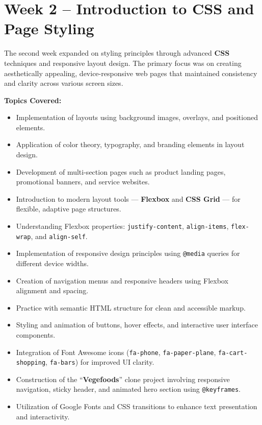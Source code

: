 \documentclass[a4paper,12pt,oneside]{report}
\numberwithin{equation}{chapter}
\numberwithin{figure}{chapter}
\numberwithin{table}{chapter}
\begin{document}
\vspace{5mm}
\noindent
\section{Week 2 – Introduction to CSS and Page Styling}

The second week expanded on styling principles through advanced \textbf{CSS} techniques and responsive layout design. The primary focus was on creating aesthetically appealing, device-responsive web pages that maintained consistency and clarity across various screen sizes.

\textbf{Topics Covered:}
\begin{itemize}
    \item Implementation of layouts using background images, overlays, and positioned elements.
    \item Application of color theory, typography, and branding elements in layout design.
    \item Development of multi-section pages such as product landing pages, promotional banners, and service websites.
    \item Introduction to modern layout tools — \textbf{Flexbox} and \textbf{CSS Grid} — for flexible, adaptive page structures.
    \item Understanding Flexbox properties: \texttt{justify-content}, \texttt{align-items}, \texttt{flex-wrap}, and \texttt{align-self}.
    \item Implementation of responsive design principles using \texttt{@media} queries for different device widths.
    \item Creation of navigation menus and responsive headers using Flexbox alignment and spacing.
    \item Practice with semantic HTML structure for clean and accessible markup.
    \item Styling and animation of buttons, hover effects, and interactive user interface components.
    \item Integration of Font Awesome icons (\texttt{fa-phone}, \texttt{fa-paper-plane}, \texttt{fa-cart-shopping}, \texttt{fa-bars}) for improved UI clarity.
    \item Construction of the “\textbf{Vegefoods}” clone project involving responsive navigation, sticky header, and animated hero section using \texttt{@keyframes}.
    \item Utilization of Google Fonts and CSS transitions to enhance text presentation and interactivity.
\end{itemize}
\end{document}
